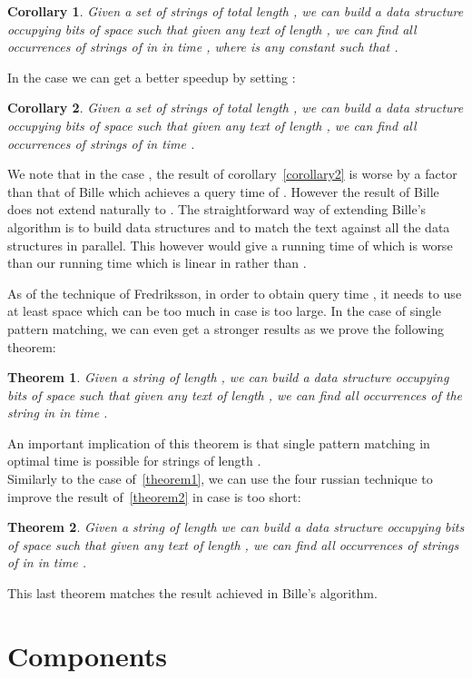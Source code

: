 \documentclass{article}
\newcommand{\?}{\mskip1.5mu}
\newtheorem{theorem}{Theorem}
\newtheorem{corollary}{Corollary}
\begin{document}
\begin{corollary}
\label{corollary4}
Given a set  of  strings of total length , we can build a data structure occupying  bits of space such that given any text  of length , we can find all occurrences of strings of  in  in time , where  is any constant such that .
\end{corollary}


In the case  we can get a better speedup by setting :
\begin{corollary}
\label{corollary5}
Given a set  of  strings of total length , we can build a data structure occupying  bits of space such that given any text  of length , we can find all occurrences of strings of  in time .
\end{corollary}
We note that in the case , the result of corollary~\ref{corollary2} is worse by a factor  than that of Bille which achieves a query time of . However the result of Bille does not extend naturally to . The straightforward way of extending Bille's algorithm is to build  data structures and to match the text against all the data structures in parallel. This however would give a running time of  which is worse than our running time  which is linear in  rather than .

As of the technique of Fredriksson, in order to obtain query time , it needs to use at least space  which can be too much in case  is too large. 
In the case of single pattern matching, we can even get a stronger results as we prove the following theorem: 
\begin{theorem}
\label{theorem3}
Given a string  of length , we can build a data structure occupying  bits of space such that given any text  of length , we can find all  occurrences of the string  in  in time .
\end{theorem}
An important implication of this theorem is that single pattern matching in optimal time  is possible for strings of length . 
\\ Similarly to the case of~\ref{theorem1}, we can use the four russian technique to improve the result of~\ref{theorem2} in case  is too short: 
\begin{theorem}
\label{theorem4}
Given a string  of length  we can build a data structure occupying  bits of space such that given any text  of length , we can find all  occurrences of strings of  in  in time . 
\end{theorem}
This last theorem matches the result achieved in Bille's  algorithm. 
\section{Components}
\end{document}
